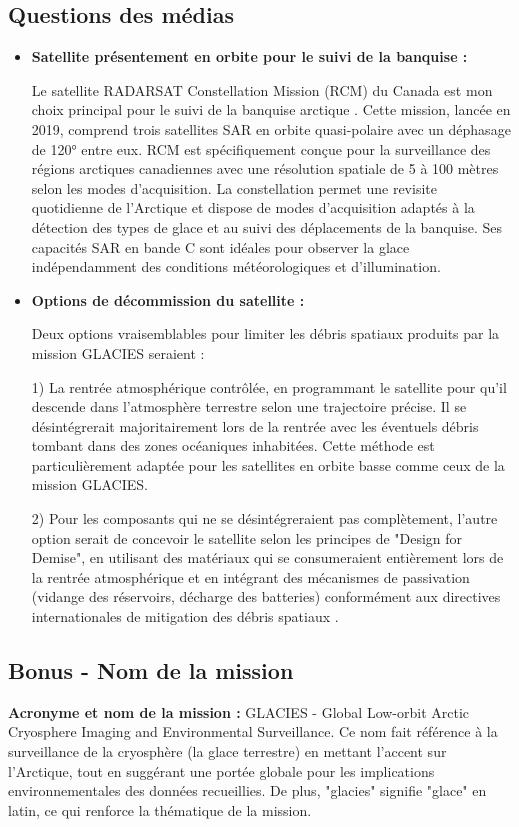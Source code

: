 \documentclass[12pt,a4paper]{article}
\begin{document}
\subsection{Questions des médias}
\begin{itemize}[label=---]
    \item \textbf{Satellite présentement en orbite pour le suivi de la banquise :}
    
    Le satellite RADARSAT Constellation Mission (RCM) du Canada est mon choix principal pour le suivi de la banquise arctique \citep{CSA2019, Zakhvatkina2022}. Cette mission, lancée en 2019, comprend trois satellites SAR en orbite quasi-polaire avec un déphasage de 120° entre eux. RCM est spécifiquement conçue pour la surveillance des régions arctiques canadiennes avec une résolution spatiale de 5 à 100 mètres selon les modes d'acquisition. La constellation permet une revisite quotidienne de l'Arctique et dispose de modes d'acquisition adaptés à la détection des types de glace et au suivi des déplacements de la banquise. Ses capacités SAR en bande C sont idéales pour observer la glace indépendamment des conditions météorologiques et d'illumination.
    
    \item \textbf{Options de décommission du satellite :}
    
    Deux options vraisemblables pour limiter les débris spatiaux produits par la mission GLACIES seraient :
    
    1) La rentrée atmosphérique contrôlée, en programmant le satellite pour qu'il descende dans l'atmosphère terrestre selon une trajectoire précise. Il se désintégrerait majoritairement lors de la rentrée avec les éventuels débris tombant dans des zones océaniques inhabitées. Cette méthode est particulièrement adaptée pour les satellites en orbite basse comme ceux de la mission GLACIES.
    
    2) Pour les composants qui ne se désintégreraient pas complètement, l'autre option serait de concevoir le satellite selon les principes de "Design for Demise", en utilisant des matériaux qui se consumeraient entièrement lors de la rentrée atmosphérique \citep{NASA2023, IADC2020} et en intégrant des mécanismes de passivation (vidange des réservoirs, décharge des batteries) conformément aux directives internationales de mitigation des débris spatiaux \citep{Dutta2022}.
\end{itemize}

\subsection{Bonus - Nom de la mission}
\textbf{Acronyme et nom de la mission :}
GLACIES - Global Low-orbit Arctic Cryosphere Imaging and Environmental Surveillance. Ce nom fait référence à la surveillance de la cryosphère (la glace terrestre) en mettant l'accent sur l'Arctique, tout en suggérant une portée globale pour les implications environnementales des données recueillies. De plus, "glacies" signifie "glace" en latin, ce qui renforce la thématique de la mission.
\end{document}
